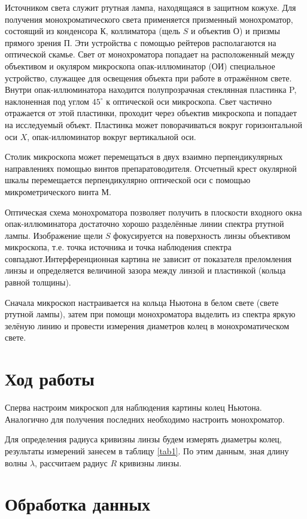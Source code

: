 \documentclass[a4paper, 12pt]{article}%
\begin{document}
	Источником света служит ртутная лампа, находящаяся в защитном кожухе. Для получения монохроматического света применяется призменный монохроматор, состоящий из конденсора $ К $, коллиматора (щель $ S $ и объектив $ О $) и призмы прямого зрения $ П $. Эти устройства с помощью рейтеров располагаются на оптической скамье. Свет от монохроматора попадает на расположенный между объективом и окуляром микроскопа опак-иллюминатор (ОИ)  специальное устройство, служащее для освещения объекта при работе в отражённом свете. Внутри опак-иллюминатора находится полупрозрачная стеклянная пластинка P, наклоненная под углом $ 45^\circ $ к оптической оси микроскопа. Свет частично отражается от этой пластинки, проходит через объектив микроскопа и попадает на исследуемый объект. Пластинка может поворачиваться вокруг горизонтальной оси $ X $, опак-иллюминатор вокруг вертикальной оси.

	Столик микроскопа может перемещаться в двух взаимно перпендикулярных направлениях помощью винтов препаратоводителя. Отсчетный крест окулярной шкалы перемещается перпендикулярно оптической оси с помощью микрометрического винта $ М $.
	
	Оптическая схема монохроматора позволяет получить в плоскости входного окна опак-иллюминатора достаточно хорошо разделённые линии спектра ртутной лампы. Изображение щели $ S $ фокусируется на поверхность линзы объективом микроскопа, т.е. точка источника и точка наблюдения спектра совпадают.Интерференционная картина не зависит от показателя преломления линзы и определяется величиной зазора между линзой и пластинкой (кольца равной толщины).

	Сначала микроскоп настраивается на кольца Ньютона в белом свете (свете ртутной лампы), затем при помощи монохроматора выделить из спектра яркую зелёную линию и провести измерения диаметров колец в монохроматическом свете. 
	

\section{Ход работы}

Сперва настроим микроскоп для наблюдения картины колец Ньютона. Аналогично для получения последних необходимо настроить монохроматор.

Для определения радиуса кривизны линзы будем измерять диаметры колец, результаты измерений занесем в таблицу \ref{tab1}. По этим данным, зная длину волны $\lambda$, рассчитаем радиус $R$ кривизны линзы.

\section{Обработка данных}
\end{document}
